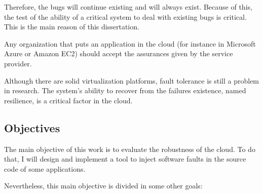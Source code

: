 Therefore, the bugs will continue existing and will always exist. Because of this, the test of the ability of a critical system to deal with existing bugs is critical. This is the main reason of this dissertation.

Any organization that puts an application in the cloud (for instance in Microsoft Azure or Amazon EC2) should accept the assurances given by the service provider.



Although there are solid virtualization platforms, fault tolerance is still a problem in research. The system's ability to recover from the failures existence, named resilience, is a critical factor in the cloud.





\subsection{Objectives}

The main objective of this work is to evaluate the robustness of the cloud. To do that, I will design and implement a tool to inject software faults in the source code of some applications.

Nevertheless, this main objective is divided in some other goals:


